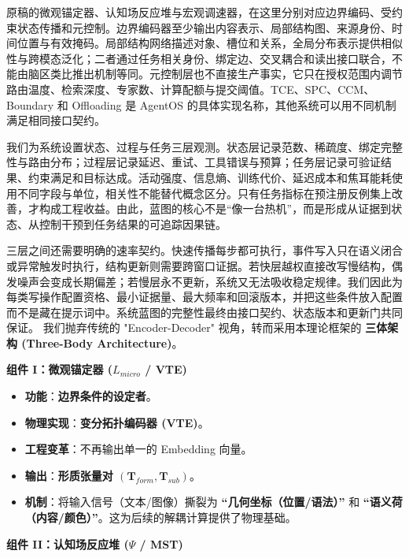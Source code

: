 原稿的微观锚定器、认知场反应堆与宏观调速器，在这里分别对应边界编码、受约束状态传播和元控制。边界编码器至少输出内容表示、局部结构图、来源身份、时间位置与有效掩码。局部结构网络描述对象、槽位和关系，全局分布表示提供相似性与跨模态泛化；二者通过任务相关身份、绑定边、交叉耦合和读出接口联合，不能由脑区类比推出机制等同。元控制层也不直接生产事实，它只在授权范围内调节路由温度、检索深度、专家数、计算配额与提交阈值。TCE、SPC、CCM、Boundary 和 Offloading 是 AgentOS 的具体实现名称，其他系统可以用不同机制满足相同接口契约。

我们为系统设置状态、过程与任务三层观测。状态层记录范数、稀疏度、绑定完整性与路由分布；过程层记录延迟、重试、工具错误与预算；任务层记录可验证结果、约束满足和目标达成。活动强度、信息熵、训练代价、延迟成本和焦耳能耗使用不同字段与单位，相关性不能替代概念区分。只有任务指标在预注册反例集上改善，才构成工程收益。由此，蓝图的核心不是“像一台热机”，而是形成从证据到状态、从控制干预到任务结果的可追踪因果链。

三层之间还需要明确的速率契约。快速传播每步都可执行，事件写入只在语义闭合或异常触发时执行，结构更新则需要跨窗口证据。若快层越权直接改写慢结构，偶发噪声会变成长期偏差；若慢层永不更新，系统又无法吸收稳定规律。我们因此为每类写操作配置资格、最小证据量、最大频率和回滚版本，并把这些条件放入配置而不是藏在提示词中。系统蓝图的完整性最终由接口契约、状态版本和更新门共同保证。
我们抛弃传统的 "Encoder-Decoder" 视角，转而采用本理论框架的 \textbf{三体架构 (Three-Body Architecture)}。



\textbf{组件 I：微观锚定器 ($L_{micro}$ / VTE)}

\begin{itemize}
    \item   \textbf{功能}：\textbf{边界条件的设定者}。
    \item   \textbf{物理实现}：\textbf{变分拓扑编码器 (VTE)}。
    \item   \textbf{工程变革}：不再输出单一的 Embedding 向量。
    \item   \textbf{输出}：\textbf{形质张量对 $(\mathbf{T}_{form}, \mathbf{T}_{sub})$}。
    \item   \textbf{机制}：将输入信号（文本/图像）撕裂为 \textbf{“几何坐标（位置/语法）”} 和 \textbf{“语义荷（内容/颜色）”}。这为后续的解耦计算提供了物理基础。
\end{itemize}



\textbf{组件 II：认知场反应堆 ($\Psi$ / MST)}


